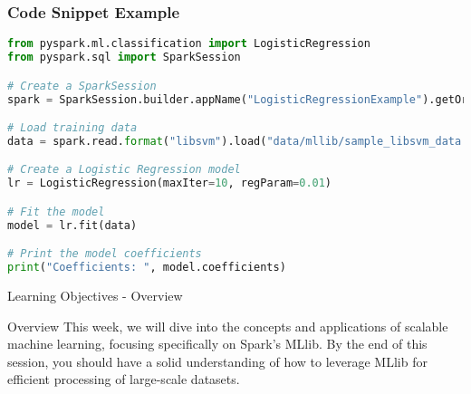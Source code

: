 \documentclass[aspectratio=169]{beamer}
\begin{document}
\begin{frame}[fragile]
    \frametitle{Code Snippet Example}
    \begin{lstlisting}[language=Python]
from pyspark.ml.classification import LogisticRegression
from pyspark.sql import SparkSession

# Create a SparkSession
spark = SparkSession.builder.appName("LogisticRegressionExample").getOrCreate()

# Load training data
data = spark.read.format("libsvm").load("data/mllib/sample_libsvm_data.txt")

# Create a Logistic Regression model
lr = LogisticRegression(maxIter=10, regParam=0.01)

# Fit the model
model = lr.fit(data)

# Print the model coefficients
print("Coefficients: ", model.coefficients)
    \end{lstlisting}
\end{frame}

\begin{frame}[fragile]{Learning Objectives - Overview}
  \begin{block}{Overview}
    This week, we will dive into the concepts and applications of scalable machine learning, focusing specifically on Spark's MLlib. By the end of this session, you should have a solid understanding of how to leverage MLlib for efficient processing of large-scale datasets.
  \end{block}
\end{frame}
\end{document}
